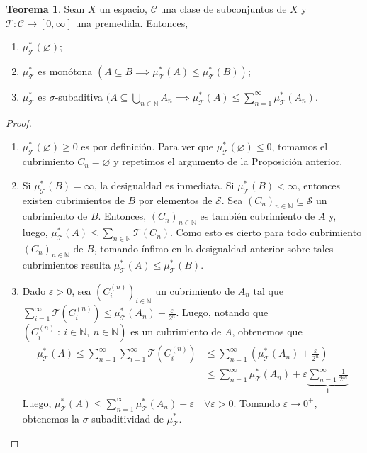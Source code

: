 \documentclass[11pt]{article}
\theoremstyle{definition} %
\newtheorem{theorem}{Teorema}[section]
\newcommand{\N}{\mathbb{N}}
\begin{document}
\begin{property}
\begin{theorem}
	Sean $X$ un espacio, $\mathscr{C}$ una clase de subconjuntos de $X$ y $\mathcal{T}:\mathscr{C} \to [0,\infty]$ una premedida. Entonces,
	\begin{enumerate}
		\item $\mu_{\mathcal{T}}^{*}(\varnothing)$;

		\item $\mu_{\mathcal{T}}^{*}$ es monótona $(A \subseteq B \implies \mu_{\mathcal{T}}^{*}(A)\leq\mu_{\mathcal{T}}^{*}(B))$;

		\item $\mu_{\mathcal{T}}^{*}$ es $\sigma$-subaditiva $(A\subseteq\bigcup_{n\in\N}A_n \implies \mu_{\mathcal{T}}^{*}(A) \leq \sum_{n=1}^{\infty} \mu_{\mathcal{T}}^{*}(A_n)$.
	\end{enumerate}
\end{theorem}
\begin{proof}

	\begin{enumerate}
		\item $\mu_{\mathcal{T}}^{*}(\varnothing)\geq 0$ es por definición. Para ver que $\mu_{\mathcal{T}}^{*}(\varnothing)\leq 0$, tomamos el cubrimiento $C_n = \varnothing$ y repetimos el argumento de la Proposición anterior.
		
		\item Si $\mu_{\mathcal{T}}^{*}(B)=\infty$, la desigualdad es inmediata. Si $\mu_{\mathcal{T}}^{*}(B)<\infty$, entonces existen cubrimientos de $B$ por elementos de $\mathscr{S}$. Sea $(C_n)_{n\in\N}\subseteq\mathscr{S}$ un cubrimiento de $B$. Entonces, $(C_n)_{n\in\N}$ es también cubrimiento de $A$ y, luego, $\mu_{\mathcal{T}}^{*}(A)\leq \sum_{n\in\N} \mathcal{T}(C_n)$. Como esto es cierto para todo cubrimiento $(C_n)_{n\in\N}$ de $B$, tomando ínfimo en la desigualdad anterior sobre tales cubrimientos resulta $\mu_{\mathcal{T}}^{*}(A) \leq \mu_{\mathcal{T}}^{*}(B)$.

		\item Dado $\varepsilon>0$, sea $(C_{i}^{(n)})_{i\in\N}$ un cubrimiento de $A_n$ tal que $\sum_{i=1}^{\infty} \mathcal{T}(C_{i}^{(n)}) \leq \mu_{\mathcal{T}}^{*}(A_n) + \frac{\varepsilon}{2^n}$. Luego, notando que $(C_{i}^{(n)}\ : \ i\in\N,\ n\in\N)$ es un cubrimiento de $A$, obtenemos que
		\begin{align*}
			\mu_{\mathcal{T}}^{*}(A) \leq \sum_{n=1}^{\infty} \sum_{i=1}^{\infty} \mathcal{T}(C_{i}^{(n)}) & \leq \sum_{n=1}^{\infty} \left(\mu_{\mathcal{T}}^{*}(A_n) + \frac{\varepsilon}{2^n} \right) \\
			& \leq \sum_{n=1}^{\infty} \mu_{\mathcal{T}}^{*}(A_n) + \varepsilon \underbrace{\sum_{n=1}^{\infty} \frac{1}{2^m}}_{1}
		\end{align*}
		Luego, $\mu_{\mathcal{T}}^{*}(A) \leq \sum_{n=1}^{\infty} \mu_{\mathcal{T}}^{*}(A_n) + \varepsilon \quad \forall \varepsilon>0$. Tomando $\varepsilon \to 0^+$, obtenemos la $\sigma$-subaditividad de $\mu_{\mathcal{T}}^{*}$.
	\end{enumerate}
\end{proof}


\end{property}
\end{document}
